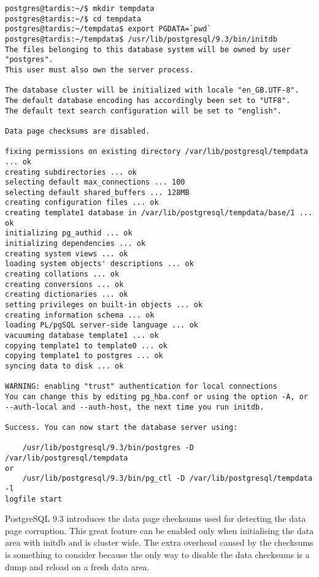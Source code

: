 \begin{verbatim}
postgres@tardis:~/$ mkdir tempdata
postgres@tardis:~/$ cd tempdata
postgres@tardis:~/tempdata$ export PGDATA=`pwd`
postgres@tardis:~/tempdata$ /usr/lib/postgresql/9.3/bin/initdb 
The files belonging to this database system will be owned by user "postgres".
This user must also own the server process.

The database cluster will be initialized with locale "en_GB.UTF-8".
The default database encoding has accordingly been set to "UTF8".
The default text search configuration will be set to "english".

Data page checksums are disabled.

fixing permissions on existing directory /var/lib/postgresql/tempdata ... ok
creating subdirectories ... ok
selecting default max_connections ... 100
selecting default shared_buffers ... 128MB
creating configuration files ... ok
creating template1 database in /var/lib/postgresql/tempdata/base/1 ... ok
initializing pg_authid ... ok
initializing dependencies ... ok
creating system views ... ok
loading system objects' descriptions ... ok
creating collations ... ok
creating conversions ... ok
creating dictionaries ... ok
setting privileges on built-in objects ... ok
creating information schema ... ok
loading PL/pgSQL server-side language ... ok
vacuuming database template1 ... ok
copying template1 to template0 ... ok
copying template1 to postgres ... ok
syncing data to disk ... ok

WARNING: enabling "trust" authentication for local connections
You can change this by editing pg_hba.conf or using the option -A, or
--auth-local and --auth-host, the next time you run initdb.

Success. You can now start the database server using:

    /usr/lib/postgresql/9.3/bin/postgres -D /var/lib/postgresql/tempdata
or
    /usr/lib/postgresql/9.3/bin/pg_ctl -D /var/lib/postgresql/tempdata -l 
logfile start

\end{verbatim}

PostgreSQL 9.3 introduces the data page 
checksums used for detecting the data page corruption. This great feature can be enabled only when 
initialising the data area with initdb and is cluster wide. The extra overhead caused by the 
checksums is something to consider because the only way to disable the data checksums is a dump 
and reload on a fresh data area.\newline

